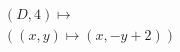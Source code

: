 \documentclass[preview]{standalone}
\begin{document}
\begin{align*}
(D,4) \mapsto \\( (x,y) \mapsto (x, -y + 2))
\end{align*}
\end{document}
